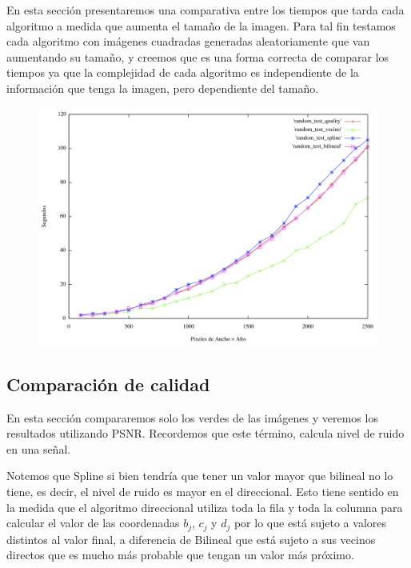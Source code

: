 En esta sección presentaremos una comparativa entre los tiempos que tarda cada algoritmo a medida que aumenta el tamaño de la imagen. Para tal fin testamos cada algoritmo con imágenes cuadradas generadas aleatoriamente que van aumentando su tamaño, y creemos que es una forma correcta de comparar los tiempos ya que la complejidad de cada algoritmo es independiente de la información que tenga la imagen, pero dependiente del tamaño.

\begin{figure}[h]
       \includegraphics[width=1\textwidth]{imagenes/tiempo_algoritmos_random.png}
\end{figure}

\newpage

\subsection{Comparación de calidad}
En esta sección compararemos solo los verdes de las imágenes y veremos los resultados utilizando PSNR. Recordemos que este término, calcula nivel de ruido en una señal.


Notemos que Spline si bien tendría que tener un valor mayor que bilineal no lo tiene, es decir, el nivel de ruido es mayor en el direccional. Esto tiene sentido en la medida que el algoritmo direccional utiliza toda la fila y toda la columna para calcular el valor de las coordenadas $b_j$, $c_j$ y $d_j$ por lo que está sujeto a valores distintos al valor final, a diferencia de Bilineal que está sujeto a sus vecinos directos que es mucho más probable que tengan un valor más próximo.
  